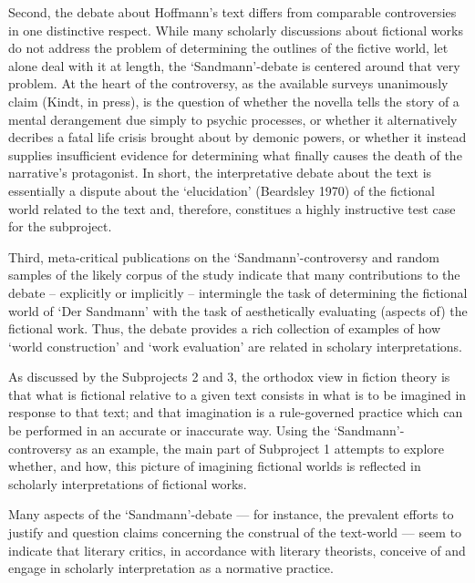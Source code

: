 Second, the debate about Hoffmann's text differs from comparable controversies in one distinctive respect. While many scholarly discussions about fictional works do not address the problem of determining the outlines of the fictive world, let alone deal with it at length, the `Sandmann'-debate is centered around that very problem. At the heart of the controversy, as the available surveys unanimously claim (Kindt, in press), is the question of whether the novella tells the story of a mental derangement due simply to psychic processes, or whether it alternatively decribes a fatal life crisis brought about by demonic powers, or whether it instead supplies insufficient evidence for determining what finally causes the death of the narrative's protagonist. In short, the interpretative debate about the text is essentially a dispute about the `elucidation' (Beardsley 1970) of the fictional world related to the text and, therefore, constitues a highly instructive test case for the subproject. 

Third, meta-critical publications on the `Sandmann'-controversy and random samples of the likely corpus of the study indicate that many contributions to the debate -- explicitly or implicitly -- intermingle the task of determining the fictional world of `Der Sandmann' with the task of aesthetically evaluating (aspects of) the fictional work. Thus, the debate provides a rich collection of examples of how `world construction' and `work evaluation' are related in scholary interpretations.

As discussed by the Subprojects 2 and 3, the orthodox view in fiction theory is that what is fictional relative to a given text consists in what is to be imagined in response to that text; and that imagination is a rule-governed practice which can be performed in an accurate or inaccurate way. Using the `Sandmann'-controversy as an example, the main part of Subproject 1 attempts to explore whether, and how, this picture of imagining fictional worlds is reflected in scholarly interpretations of fictional works.

Many aspects of the `Sandmann'-debate --- for instance, the prevalent efforts to justify and question claims concerning the construal of the text-world --- seem to indicate that literary critics, in accordance with literary theorists, conceive of and engage in scholarly interpretation as a normative practice.  

